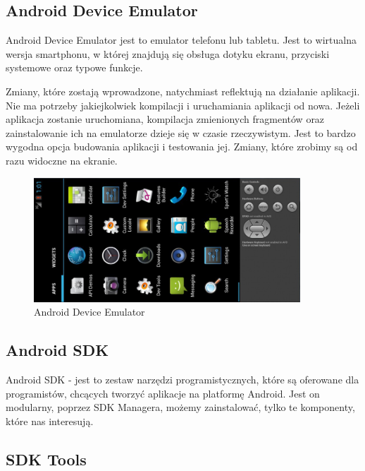 \subsection{Android Device Emulator}
\label{c223}

Android Device Emulator jest to emulator telefonu lub tabletu. Jest to wirtualna wersja smartphonu, w której znajdują się obsługa dotyku ekranu, przyciski systemowe oraz typowe funkcje.

Zmiany, które zostają wprowadzone, natychmiast reflektują na działanie aplikacji. Nie ma potrzeby jakiejkolwiek kompilacji i uruchamiania aplikacji od nowa. Jeżeli aplikacja zostanie uruchomiana, kompilacja zmienionych fragmentów oraz zainstalowanie ich na emulatorze dzieje się w czasie rzeczywistym. Jest to bardzo wygodna opcja budowania aplikacji i testowania jej. Zmiany, które zrobimy są od razu widoczne na ekranie.

\begin{figure}[th] 
\centering\includegraphics[width=10cm]{figures/emulator}
\caption{Android Device Emulator}
\end{figure}


\subsection{Android SDK}

Android SDK - jest to zestaw narzędzi programistycznych, które są oferowane dla programistów, chcących tworzyć aplikacje na platformę Android. Jest on modularny, poprzez SDK Managera, możemy zainstalować, tylko te komponenty, które nas interesują. 

\subsection{SDK Tools}

